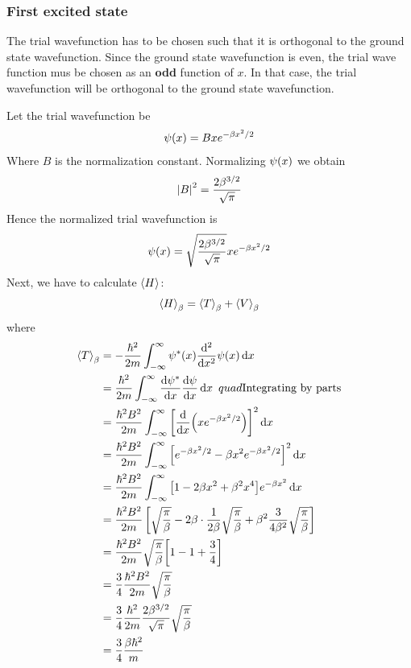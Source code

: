 	
	\subsubsection{First excited state}
	
	The trial wavefunction has to be chosen such that it is orthogonal to the ground state wavefunction. Since the ground state wavefunction is even, the trial wave function mus be chosen as an \textbf{odd} function of $x$. In that case, the trial wavefunction will be orthogonal to the ground state wavefunction.
	
	Let the trial wavefunction be
	\begin{align}
		\psi\qty(x) = B x e^{-\beta x^2/2}
	\end{align}
	Where $B$ is the normalization constant. Normalizing $\psi\qty(x)$ we obtain
	\begin{align}
		\abs{B}^2 = \frac{2 \beta^{3/2}}{\sqrt{\pi}}
	\end{align}
	Hence the normalized trial wavefunction is
	\begin{align}
		\psi\qty(x) = \sqrt{\frac{2 \beta^{3/2}}{\sqrt{\pi}}} x e^{-\beta x^2/2}
	\end{align}
	Next, we have to calculate $\expval{H}$:
	\begin{align}
		\expval{H}_\beta = \expval{T}_\beta + \expval{V}_\beta
	\end{align}
	where
	\begin{align*}
		\expval{T}_\beta 
		&= - \frac{\hbar^2}{2 m} \int_{-\infty}^{\infty} \psi^*\qty(x) \dv[2]{}{x} \psi\qty(x) \dd{x}\\
		&= \frac{\hbar^2}{2 m} \int_{-\infty}^{\infty} \dv{\psi^*}{x} \dv{\psi}{x} \dd{x} \ quad \text{Integrating by parts}\\
		&= \frac{\hbar^2 B^2}{2 m} \int_{-\infty}^{\infty} \qty[\dv{}{x} \qty(x e^{-\beta x^2/2})]^2 \dd{x}\\
		&= \frac{\hbar^2 B^2}{2 m} \int_{-\infty}^{\infty} \qty[e^{-\beta x^2/2} - \beta x^2 e^{-\beta x^2/2}]^2 \dd{x} \\
		&= 	\frac{\hbar^2 B^2}{2 m} \int_{-\infty}^{\infty} \qty[1 - 2\beta x^2 + \beta^2 x^4] e^{-\beta x^2} \dd{x} \\
		&= \frac{\hbar^2 B^2}{2 m} \left[
		\sqrt{\frac{\pi}{\beta}} - 2 \beta \cdot \frac{1}{2\beta} \sqrt{\frac{\pi}{\beta}}  + \beta^2 \frac{3}{4 \beta^2} \sqrt{\frac{\pi}{\beta}} 
		\right] \\
		&= \frac{\hbar^2 B^2}{2 m} \sqrt{\frac{\pi}{\beta}} \qty[1 - 1 + \frac{3}{4}] \\
		&= \frac{3}{4} \frac{\hbar^2 B^2}{2 m} \sqrt{\frac{\pi}{\beta}} \\
		&= \frac{3}{4} \frac{\hbar^2}{2 m} \frac{2 \beta^{3/2}}{\sqrt{\pi}}  \sqrt{\frac{\pi}{\beta}} \\
		&= \frac{3}{4} \frac{\beta \hbar^2}{m}
	\end{align*}
